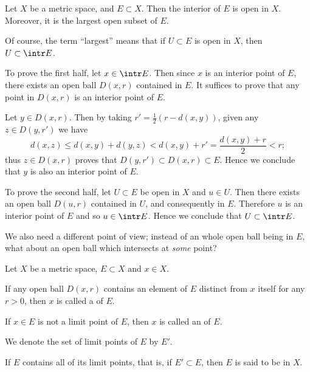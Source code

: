 \begin{observation}
    \label{observation:interior}
    Let \(X\) be a metric space, and \(E\subset X\).
    Then the interior of \(E\) is open in \(X\).
    Moreover, it is the largest open subset of \(E\).
\end{observation}
Of course, the term ``largest'' means that
if \(U\subset E\) is open in \(X\), then \(U\subset\intr E\).
\begin{myproof}
    To prove the first half, let \(x\in\intr E\).
    Then since \(x\) is an interior point of \(E\),
    there exists an open ball \(D(x,r)\) contained in \(E\).
    It suffices to prove that
    any point in \(D(x,r)\) is an interior point of \(E\).

    Let \(y\in D(x,r)\).
    Then by taking \(r'=\frac{1}{2}(r-d(x,y))\),
    given any \(z\in D(y,r')\) we have
    \[
        d(x,z)
        \le d(x,y)+d(y,z)
        <d(x,y)+r'
        =\frac{d(x,y)+r}{2}
        <r;
    \]
    thus \(z\in D(x,r)\) proves that \(D(y,r')\subset D(x,r)\subset E\).
    Hence we conclude that \(y\) is also an interior point of \(E\).

    To prove the second half,
    let \(U\subset E\) be open in \(X\)
    and \(u\in U\).
    Then there exists an open ball \(D(u,r)\) contained in \(U\),
    and consequently in \(E\).
    Therefore \(u\) is an interior point of \(E\)
    and so \(u\in\intr E\).
    Hence we conclude that \(U\subset\intr E\).
\end{myproof}

We also need a different point of view;
instead of an whole open ball being in \(E\),
what about an open ball which intersects at \emph{some} point?

\begin{definition}[continues=def:mopen]
    \label{def:mclosed}
    Let \(X\) be a metric space,
    \(E\subset X\) and \(x\in X\).
    \begin{nlist}
        \setcounter{nlisti}{5}
        \item If any open ball \(D(x,r)\) contains an element of \(E\)
        distinct from \(x\) itself for any \(r>0\),
        then \(x\) is called
        a  of \(E\).
        
        \item If \(x\in E\) is not a limit point of \(E\),
        then \(x\) is called
        an  of \(E\).

        \item We denote the set of limit points of \(E\) by \(E'\).
        
        \item If \(E\) contains all of its limit points,
        that is, if \(E'\subset E\),
        then \(E\) is said to be  in \(X\).
    \end{nlist}
\end{definition}

